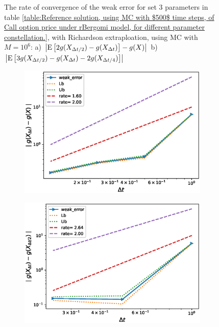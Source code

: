 \documentclass[11pt]{article}
\newcommand{\expt}[1]{\mathrm{E}\left[#1\right]}
\begin{document}
\begin{figure}[!htbp]
	\caption{The rate of convergence of the weak error for set $3$ parameters in table \ref{table:Reference solution, using MC with $500$ time steps, of Call option price under rBergomi model, for different parameter constellation.}, with Richardson extraploation, using MC with $M=10^6$: a) $\abs{\expt{2 g(X_{\Delta t/2}) -g(X_{\Delta t})}-g(X)}$  b) $\abs{\expt{3 g(X_{\Delta t/2})-g(X_{\Delta t})-2 g(X_{\Delta t/4})}}$ }
	\label{fig:Weak_rate_H_007_with_rich_K08}
\end{figure}




\begin{figure}[!htbp]
	\centering
	\begin{subfigure}{.4\textwidth}
		\centering
		\includegraphics[width=1\linewidth]{./figures/rBergomi_weak_error_rates/with_richardson/H_007/weak_convergence_order_Bergomi_H_007_K_12_M_2_10_6_richardson_relative}
		\caption{}
		\label{fig:sub3}
	\end{subfigure}%
	\begin{subfigure}{.4\textwidth}
		\centering
		\includegraphics[width=1\linewidth]{./figures/rBergomi_weak_error_rates/with_richardson/H_007/weak_convergence_order_differences_Bergomi_H_007_K_12_M_2_10_6_richardson_relative}
		\caption{}
		\label{fig:sub4}
	\end{subfigure}
	

\end{figure}
\end{document}
